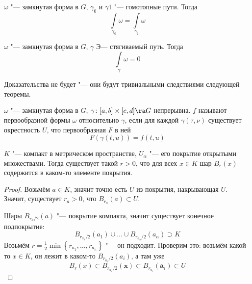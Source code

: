 \begin{theorem}
	$\omega$ "--- замкнутая форма в $G$, $\gamma_0$ и $\gamma1$ "--- гомотопные пути.
	Тогда
	\[ \int\limits_{\gamma_0} \omega = \int\limits_{\gamma_1} \omega \]
\end{theorem}

\begin{theorem}
	$\omega$ "--- замкнутая форма в $G$, $\gamma$ Э--- стягиваемый путь.
	Тогда
	\[ \int\limits_\gamma \omega = 0 \]
\end{theorem}

Доказательства не будет "--- они будут тривиальными следствиями следующей теоремы.

\begin{Def}
	$\omega$ "--- замкнутая форма в $G$, $\gamma\colon [a, b] \times [c, d] \ra G$ непрерывна.
	$f$ называют первообразной формы $\omega$ относительно $\gamma$, если для каждой $\gamma(\tau, \nu)$
	существует окрестность $U$, что первообразная $F$ в ней
	\[ F(\gamma(t, u)) = f(t, u) \]
\end{Def}

\begin{lemma}[Лебега]
	$K$ "--- компакт в метрическом пространстве, $U_\alpha$ "--- его покрытие открытыми множествами.
	Тогда существует такой $r > 0$, что для всех $x \in K$ шар $B_r(x)$ содержится в каком-то элементе покрытия.
\end{lemma}
\begin{proof}
	Возьмём $a \in K$, значит точно есть $U$ из покрытия, накрывающая $U$.
	Значит, существует $r_a > 0$, что $B_{r_a}(a) \subset U$.

	Шары $B_{r_a / 2}(a)$ "--- покрытие компакта, значит существует конечное подпокрытие:
	\[ B_{r_{a_1} / 2}(a_1) \cup \dots \cup B_{r_{a_n} / 2}(a_n) \supset K \]
	Возьмём $r = \frac12 \min \left\{ r_{a_1}, \dots, r_{a_n} \right\}$ "--- он подходит.
	Проверим это: возьмём какой-то $x \in K$, он лежит в каком-то $B_{r_{a_i} / 2}(a_i)$,
	а там уже
	\[ B_r(x) \subset B_{r_{a_i} / 2}(\mathbf x) \subset B_{r_{a_i}}(\mathbf a_i) \subset U\]
\end{proof}

